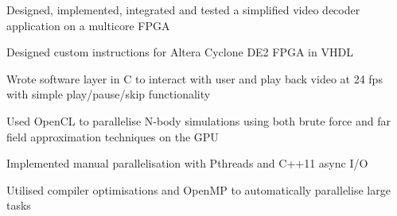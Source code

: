 \documentclass[letterpaper]{deedy-resume} %
\begin{document}
\begin{minipage}[t]{0.66\textwidth}
\begin{tightitemize}
\item Designed, implemented, integrated and tested a simplified video decoder application on a multicore FPGA
\item Designed custom instructions for Altera Cyclone DE2 FPGA in VHDL
\item Wrote software layer in C to interact with user and play back video at 24 fps with simple play/pause/skip functionality
\end{tightitemize}

\begin{tightitemize}
\item Used OpenCL to parallelise N-body simulations using both brute force and far field approximation techniques on the GPU
\item Implemented manual parallelisation with Pthreads and C++11 async I/O
\item Utilised compiler optimisations and OpenMP to automatically parallelise large tasks
\end{tightitemize}


\end{minipage} %








\end{document}
